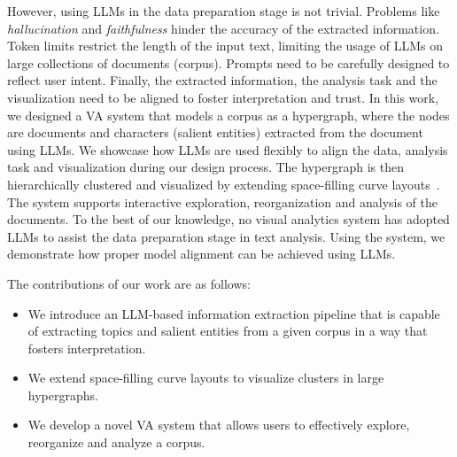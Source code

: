 However, using LLMs in the data preparation stage is not trivial. 
Problems like \textit{hallucination} and \textit{faithfulness} hinder the accuracy of the extracted information.
Token limits restrict the length of the input text, limiting the usage of LLMs on large collections of documents (corpus).
Prompts need to be carefully designed to reflect user intent.
Finally, the extracted information, the analysis task and the visualization need to be aligned to foster interpretation and trust.
In this work, we designed a VA system that models a corpus as a hypergraph, where the nodes are documents and characters (salient entities) extracted from the document using LLMs.
We showcase how LLMs are used flexibly to align the data, analysis task and visualization during our design process.
The hypergraph is then hierarchically clustered and visualized by extending space-filling curve layouts~\cite{muelder2008sfc}.
The system supports interactive exploration, reorganization and analysis of the documents.
To the best of our knowledge, no visual analytics system has adopted LLMs to assist the data preparation stage in text analysis.
Using the system, we demonstrate how proper model alignment can be achieved using LLMs.

The contributions of our work are as follows:
\begin{itemize}
    \item We introduce an LLM-based information extraction pipeline that is capable of extracting topics and salient entities from a given corpus in a way that fosters interpretation.
    \item We extend space-filling curve layouts to visualize clusters in large hypergraphs.
    \item We develop a novel VA system that allows users to effectively explore, reorganize and analyze a corpus.
\end{itemize}









